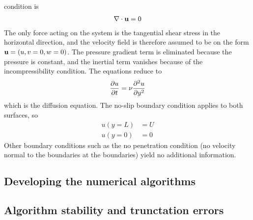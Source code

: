 \documentclass[aps,reprint]{revtex4-1}
\begin{document}
condition is
\begin{align*}
  \nabla \cdot \vb{u} = 0
\end{align*}
The only force acting on the system is the tangential shear stress in the
horizontal direction, and the velocity field is therefore assumed to be on the
form $\vb{u} = (u,v = 0,w = 0)$. The pressure gradient term is eliminated because the
pressure is constant, and the inertial term vanishes because of the incompressibility
condition. The equations reduce to
\begin{align}
  \pdv{u}{t} = \nu \pdv[2]{u}{y}
\end{align}
which is the diffusion equation. The no-slip boundary condition applies to both
surfaces, so
\begin{align*}
  u(y = L) &= U \\
  u(y = 0) &= 0
\end{align*}
Other boundary conditions such as the no penetration condition (no velocity
normal to the boundaries at the boundaries) yield no additional information.
\subsection{Developing the numerical algorithms}

\subsection{Algorithm stability and trunctation errors}
\end{document}
